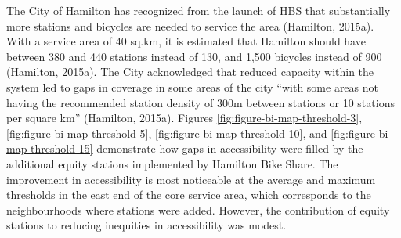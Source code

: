 \documentclass[]{elsarticle} %
\begin{document}
The City of Hamilton has recognized from the launch of HBS that
substantially more stations and bicycles are needed to service the area
(Hamilton, 2015a). With a service area of 40 sq.km, it is estimated that
Hamilton should have between 380 and 440 stations instead of 130, and
1,500 bicycles instead of 900 (Hamilton, 2015a). The City acknowledged
that reduced capacity within the system led to gaps in coverage in some
areas of the city ``with some areas not having the recommended station
density of 300m between stations or 10 stations per square km''
(Hamilton, 2015a). Figures \ref{fig:figure-bi-map-threshold-3},
\ref{fig:figure-bi-map-threshold-5},
\ref{fig:figure-bi-map-threshold-10}, and
\ref{fig:figure-bi-map-threshold-15} demonstrate how gaps in
accessibility were filled by the additional equity stations implemented
by Hamilton Bike Share. The improvement in accessibility is most
noticeable at the average and maximum thresholds in the east end of the
core service area, which corresponds to the neighbourhoods where
stations were added. However, the contribution of equity stations to
reducing inequities in accessibility was modest.
\end{document}
